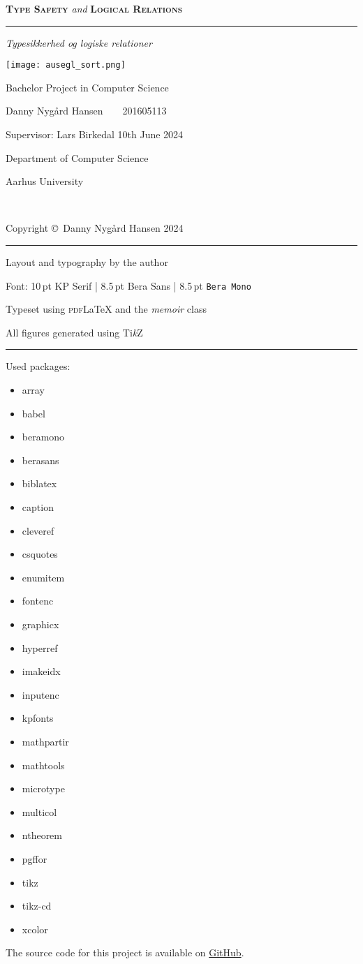 \documentclass[a4paper,10pt,twoside]{memoir}
\title{\doctitle}
\author{\docauthor}
\newcommand{\classfont}[1]{\textit{\textsf{#1}}}
\newcommand{\titlefontbig}{\scshape\bfseries\color{titlered}}
\newcommand{\titlefontsmall}{\normalfont\itshape\color{black!70}}
\newcommand*\TikZ{\textup{Ti\textit{k}Z}}
\renewcommand{\maketitle}{
\begin{titlingpage*}
    \begin{adjustwidth}{0cm}{-5cm}
		\centering
		\thispagestyle{empty}
		{%
			\large%
			{\Huge {\titlefontbig Type Safety} {\titlefontsmall and} {\titlefontbig Logical Relations}}\par
			\rule{10cm}{1pt}\par
			\vspace*{0.5\onelineskip}%
			{\LARGE\itshape Typesikkerhed og logiske relationer}\par
			\vspace*{4\onelineskip}\par
			\texttt{[image: ausegl\_sort.png]}\par
			\vspace*{4\onelineskip}%
			Bachelor Project in Computer Science\par
			Danny Nygård Hansen~~{\footnotesize\textbullet}~~201605113\par
		}%
		\vfill
		\vspace*{2\onelineskip}
		Supervisor: Lars Birkedal\hfill
		10th June 2024\par
		\vspace*{2\onelineskip}%
		\small%
		Department of Computer Science\par
		Aarhus University\par~\par
		\enlargethispage{2\onelineskip}
	\end{adjustwidth}
	\newpage
    \thispagestyle{empty}
    \small%
    \strut\vfill
    \begin{adjustwidth}{-5cm}{0cm}
        \begin{flushleft}
            Copyright \copyright\ Danny Nygård Hansen 2024

            \plainbreak{1}

            Layout and typography by the author \par
            Font: 10\,pt KP Serif | 8.5\,pt \textsf{Bera Sans} | 8.5\,pt \texttt{Bera Mono} \par
            Typeset using \textsc{pdf}\LaTeX{} and the \classfont{memoir} class \par
            All figures generated using \TikZ

            \plainbreak{1}

            Used packages:
            \begin{multicols}{4}
                \sffamily
                \raggedcolumns
                \begin{itemize}[label={}]
                    \item array
                    \item babel
                    \item beramono
                    \item berasans
                    \item biblatex
                    \item caption
                    \item cleveref
                    \item csquotes
                    \item enumitem
                    \item fontenc
                    \item graphicx
                    \item hyperref
                    \item imakeidx
                    \item inputenc
                    \item kpfonts
                    \item mathpartir
                    \item mathtools
                    \item microtype
                    \item multicol
                    \item ntheorem
                    \item pgffor
                    \item tikz
                    \item tikz-cd
                    \item xcolor
                \end{itemize}
            \end{multicols}
            The source code for this project is available on \href{https://github.com/dnhansen/cs-bachelor-project}{GitHub}.
        \end{flushleft}
    \end{adjustwidth}
    \newpage
\end{titlingpage*}
}
\begin{document}
\frontmatter

\maketitle

\begin{otherlanguage}{danish}
    \begin{abstract}
        \noindent I denne opgave studerer vi typesikkerhed af en udgave af System $\mathbf{F}$ med referencer og rekursive funktioner og typer. Vi tager først den klassiske tilgang, idet vi beviser sætninger om progress og preservation som medfører typesikkerhed for dette sprog.

        For et fragment af dette sprog uden referencer og rekursion beviser vi også typesikkerhed ved hjælp af et logisk prædikat, og vi definerer en binær logisk relation som kan benyttes til at vise kontekstuel ækvivalens af programmer.
    \end{abstract}
    \end{otherlanguage}
    \begin{abstract}
        \noindent In this report we study type safety of a version of System $\mathbf{F}$ with references and recursive functions and types. We first take the classical approach, proving progress and preservation theorems which imply type safety for this language.

        For a fragment of this language without references and recursion we also prove type safety using a logical predicate, and we define a binary logical relation which can be used to show contextual equivalence of programs.
    \end{abstract}
    
    \cleardoublepage
    
    \tableofcontents
    \cleardoublepage




\mainmatter


\end{document}
